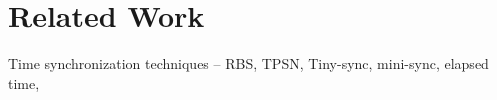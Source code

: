 \section{Related Work}

Time synchronization techniques -- RBS, TPSN, Tiny-sync, mini-sync,
elapsed time,
